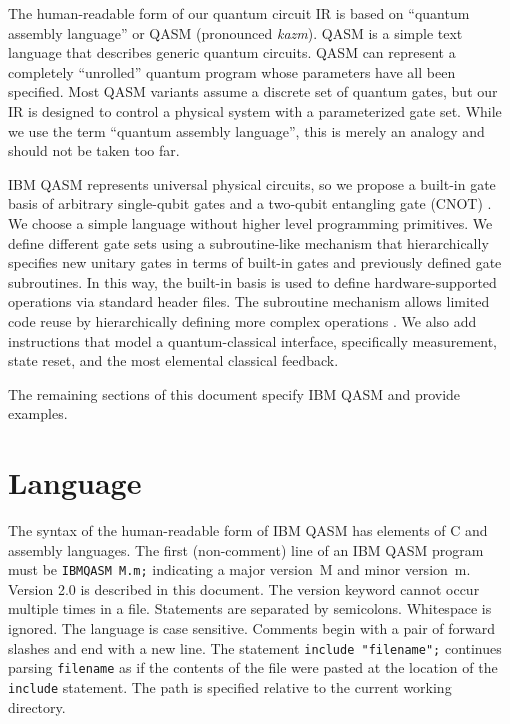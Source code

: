 \documentclass[USenglish,12pt,fleqn]{article} %
\newcommand*{\code}{\texttt}
\begin{document}
The human-readable form of our quantum circuit IR is based on ``quantum assembly language'' \cite{qasm2circ,qasmtools,svore06,quale,dousti16} or QASM (pronounced {\it kazm}). QASM is a simple text language that describes generic quantum circuits. QASM can represent a completely “unrolled” quantum program whose parameters have all been specified. Most QASM variants assume a discrete set of quantum gates, but our IR is designed to control a physical system with a parameterized gate set. While we use the term ``quantum assembly language'', this is merely an analogy and should not be taken too far.

IBM QASM represents universal physical circuits, so we propose a built-in gate basis of arbitrary single-qubit gates and a two-qubit entangling gate (CNOT) \cite{barenco95}. We choose a simple language without higher level programming primitives. We define different gate sets using a subroutine-like mechanism that hierarchically specifies new unitary gates in terms of built-in gates and previously defined gate subroutines. In this way, the built-in basis is used to define hardware-supported operations via standard header files. The subroutine mechanism allows limited code reuse by hierarchically defining more complex operations \cite{scaffold,dousti16}. We also add instructions that model a quantum-classical interface, specifically measurement, state reset, and the most elemental classical feedback.

The remaining sections of this document specify IBM QASM and provide examples.

\section{Language}\label{sec:spec}

The syntax of the human-readable form of IBM QASM has elements of C and assembly languages. The first (non-comment) line of an IBM QASM program must be \code{IBMQASM M.m;} indicating a major version~M and minor version~m. Version 2.0 is described in this document. The version keyword cannot occur multiple times in a file. Statements are separated by semicolons. Whitespace is ignored. The language is case sensitive. Comments begin with a pair of forward slashes and end with a new line. The statement \code{include "filename";} continues parsing \code{filename} as if the contents of the file were pasted at the location of the \code{include} statement. The path is specified relative to the current working directory.
\end{document}
